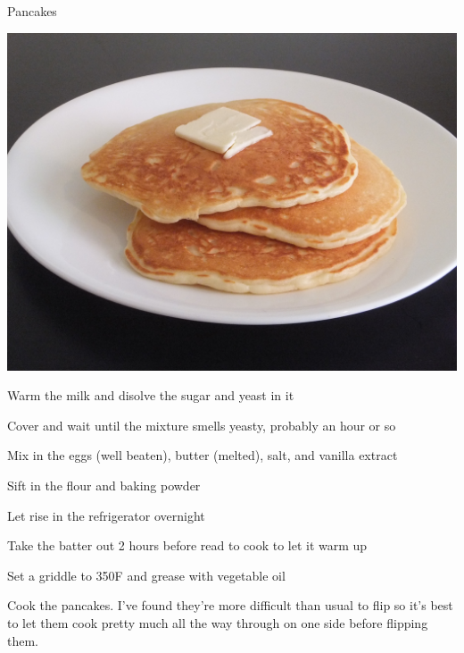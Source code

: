 \documentclass{recipe}
\begin{document}
\begin{recipe}{Pancakes}

  \begin{ingredients}
  \end{ingredients}

  \begin{images}
    \begin{image}
      \includegraphics[width=\linewidth,trim=0px 0px 0px 0px, clip=true]{pancakes-01.jpeg}
    \end{image}
  \end{images}

  \begin{steps}
  \item Warm the milk and disolve the sugar and yeast in it
  \item Cover and wait until the mixture smells yeasty, probably an
    hour or so
  \item Mix in the eggs (well beaten), butter (melted), salt, and
    vanilla extract
  \item Sift in the flour and baking powder
  \item Let rise in the refrigerator overnight
  \item Take the batter out 2 hours before read to cook to let it warm
    up
  \item Set a griddle to 350\degree F and grease with vegetable oil
  \item Cook the pancakes.  I've found they're more difficult than
    usual to flip so it's best to let them cook pretty much all the
    way through on one side before flipping them.
  \end{steps}
\end{recipe}
\end{document}
